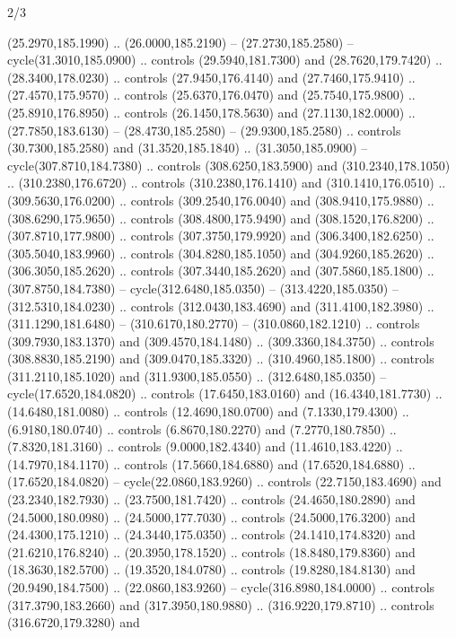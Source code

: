 \begin{flagdescription}{2/3}
\begin{scope}[xshift=0.5\flaglength,yshift=0.5\flagwidth,scale=\stretchfactor]
\begin{scope}[scale=0.001645\flagwidth,yshift=65mm,xshift=-63mm]
\begin{scope}[y=0.80pt, x=0.80pt, yscale=-1,]
\begin{scope}[cm={{1.33333,0.0,0.0,1.33333,(0.0,1e-05)}}]
  (25.2970,185.1990) .. (26.0000,185.2190) -- (27.2730,185.2580) --
  cycle(31.3010,185.0900) .. controls (29.5940,181.7300) and (28.7620,179.7420)
  .. (28.3400,178.0230) .. controls (27.9450,176.4140) and (27.7460,175.9410) ..
  (27.4570,175.9570) .. controls (25.6370,176.0470) and (25.7540,175.9800) ..
  (25.8910,176.8950) .. controls (26.1450,178.5630) and (27.1130,182.0000) ..
  (27.7850,183.6130) -- (28.4730,185.2580) -- (29.9300,185.2580) .. controls
  (30.7300,185.2580) and (31.3520,185.1840) .. (31.3050,185.0900) --
  cycle(307.8710,184.7380) .. controls (308.6250,183.5900) and
  (310.2340,178.1050) .. (310.2380,176.6720) .. controls (310.2380,176.1410) and
  (310.1410,176.0510) .. (309.5630,176.0200) .. controls (309.2540,176.0040) and
  (308.9410,175.9880) .. (308.6290,175.9650) .. controls (308.4800,175.9490) and
  (308.1520,176.8200) .. (307.8710,177.9800) .. controls (307.3750,179.9920) and
  (306.3400,182.6250) .. (305.5040,183.9960) .. controls (304.8280,185.1050) and
  (304.9260,185.2620) .. (306.3050,185.2620) .. controls (307.3440,185.2620) and
  (307.5860,185.1800) .. (307.8750,184.7380) -- cycle(312.6480,185.0350) --
  (313.4220,185.0350) -- (312.5310,184.0230) .. controls (312.0430,183.4690) and
  (311.4100,182.3980) .. (311.1290,181.6480) -- (310.6170,180.2770) --
  (310.0860,182.1210) .. controls (309.7930,183.1370) and (309.4570,184.1480) ..
  (309.3360,184.3750) .. controls (308.8830,185.2190) and (309.0470,185.3320) ..
  (310.4960,185.1800) .. controls (311.2110,185.1020) and (311.9300,185.0550) ..
  (312.6480,185.0350) -- cycle(17.6520,184.0820) .. controls (17.6450,183.0160)
  and (16.4340,181.7730) .. (14.6480,181.0080) .. controls (12.4690,180.0700)
  and (7.1330,179.4300) .. (6.9180,180.0740) .. controls (6.8670,180.2270) and
  (7.2770,180.7850) .. (7.8320,181.3160) .. controls (9.0000,182.4340) and
  (11.4610,183.4220) .. (14.7970,184.1170) .. controls (17.5660,184.6880) and
  (17.6520,184.6880) .. (17.6520,184.0820) -- cycle(22.0860,183.9260) ..
  controls (22.7150,183.4690) and (23.2340,182.7930) .. (23.7500,181.7420) ..
  controls (24.4650,180.2890) and (24.5000,180.0980) .. (24.5000,177.7030) ..
  controls (24.5000,176.3200) and (24.4300,175.1210) .. (24.3440,175.0350) ..
  controls (24.1410,174.8320) and (21.6210,176.8240) .. (20.3950,178.1520) ..
  controls (18.8480,179.8360) and (18.3630,182.5700) .. (19.3520,184.0780) ..
  controls (19.8280,184.8130) and (20.9490,184.7500) .. (22.0860,183.9260) --
  cycle(316.8980,184.0000) .. controls (317.3790,183.2660) and
  (317.3950,180.9880) .. (316.9220,179.8710) .. controls (316.6720,179.3280) and

\end{scope}
\end{scope}
\end{scope}
\end{scope}
\end{flagdescription}
